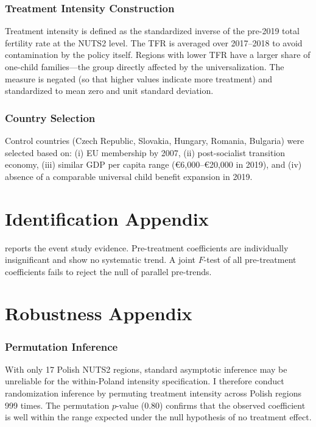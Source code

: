 \documentclass[12pt]{article}
\begin{document}
\subsubsection*{Treatment Intensity Construction}  Treatment intensity is defined as the standardized inverse of the pre-2019 total fertility rate at the NUTS2 level. The TFR is averaged over 2017--2018 to avoid contamination by the policy itself. Regions with lower TFR have a larger share of one-child families---the group directly affected by the universalization. The measure is negated (so that higher values indicate more treatment) and standardized to mean zero and unit standard deviation.

\subsubsection*{Country Selection}  Control countries (Czech Republic, Slovakia, Hungary, Romania, Bulgaria) were selected based on: (i) EU membership by 2007, (ii) post-socialist transition economy, (iii) similar GDP per capita range (\euro{}6,000--\euro{}20,000 in 2019), and (iv) absence of a comparable universal child benefit expansion in 2019.


\section{Identification Appendix}

 reports the event study evidence. Pre-treatment coefficients are individually insignificant and show no systematic trend. A joint $F$-test of all pre-treatment coefficients fails to reject the null of parallel pre-trends.


\section{Robustness Appendix}

\subsubsection*{Permutation Inference}  With only 17 Polish NUTS2 regions, standard asymptotic inference may be unreliable for the within-Poland intensity specification. I therefore conduct randomization inference by permuting treatment intensity across Polish regions 999 times. The permutation $p$-value (0.80) confirms that the observed coefficient is well within the range expected under the null hypothesis of no treatment effect.
\end{document}
